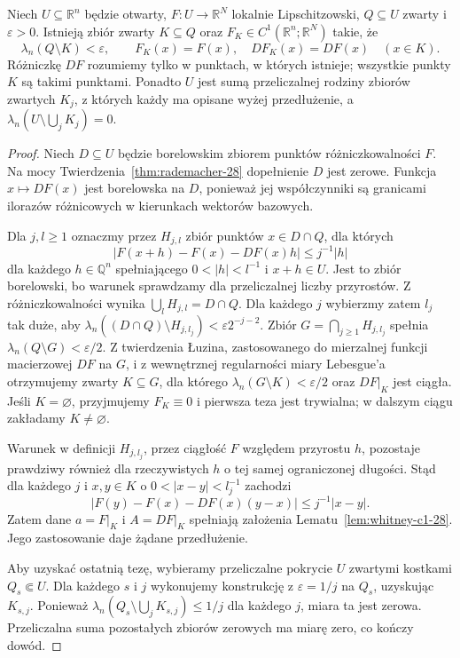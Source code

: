\begin{lemat}
\label{lem:lusin-whitney-28}
Niech $U\subseteq\mathbb R^n$ będzie otwarty,
$F:U\to\mathbb R^N$ lokalnie Lipschitzowski,
$Q\subseteq U$ zwarty i $\varepsilon>0$.
Istnieją zbiór zwarty $K\subseteq Q$ oraz
$F_K\in C^1(\mathbb R^n;\mathbb R^N)$ takie, że
\[
 \lambda_n(Q\setminus K)<\varepsilon,\qquad
 F_K(x)=F(x),\quad DF_K(x)=DF(x)\quad(x\in K).
\]
Różniczkę $DF$ rozumiemy tylko w punktach,
w których istnieje; wszystkie punkty $K$ są
takimi punktami. Ponadto $U$ jest sumą przeliczalnej
rodziny zbiorów zwartych $K_j$, z których każdy
ma opisane wyżej przedłużenie, a
$\lambda_n(U\setminus\bigcup_jK_j)=0$.
\end{lemat}
\begin{proof}
Niech $D\subseteq U$ będzie borelowskim zbiorem
punktów różniczkowalności $F$. Na mocy
Twierdzenia~\ref{thm:rademacher-28} dopełnienie
$D$ jest zerowe. Funkcja $x\mapsto DF(x)$ jest
borelowska na $D$, ponieważ jej współczynniki
są granicami ilorazów różnicowych w kierunkach
wektorów bazowych.

Dla $j,l\ge1$ oznaczmy przez $H_{j,l}$ zbiór
punktów $x\in D\cap Q$, dla których
\[
 |F(x+h)-F(x)-DF(x)h|\le j^{-1}|h|
\]
dla każdego $h\in\mathbb Q^n$ spełniającego
$0<|h|<l^{-1}$ i $x+h\in U$. Jest to zbiór
borelowski, bo warunek sprawdzamy dla
przeliczalnej liczby przyrostów. Z różniczkowalności
wynika $\bigcup_lH_{j,l}=D\cap Q$.
Dla każdego $j$ wybierzmy zatem $l_j$ tak duże,
aby $\lambda_n((D\cap Q)\setminus H_{j,l_j})
<\varepsilon2^{-j-2}$. Zbiór
$G=\bigcap_{j\ge1}H_{j,l_j}$ spełnia
$\lambda_n(Q\setminus G)<\varepsilon/2$.
Z twierdzenia Łuzina, zastosowanego do mierzalnej
funkcji macierzowej $DF$ na $G$, i z wewnętrznej
regularności miary Lebesgue'a otrzymujemy zwarty
$K\subseteq G$, dla którego
$\lambda_n(G\setminus K)<\varepsilon/2$ oraz
$DF|_K$ jest ciągła. Jeśli $K=\varnothing$,
przyjmujemy $F_K\equiv0$ i pierwsza teza jest
trywialna; w dalszym ciągu zakładamy $K\ne\varnothing$.

Warunek w definicji $H_{j,l_j}$, przez ciągłość
$F$ względem przyrostu $h$, pozostaje prawdziwy
również dla rzeczywistych $h$ o tej samej
ograniczonej długości. Stąd dla każdego $j$ i
$x,y\in K$ o $0<|x-y|<l_j^{-1}$ zachodzi
\[
 |F(y)-F(x)-DF(x)(y-x)|\le j^{-1}|x-y|.
\]
Zatem dane $a=F|_K$ i $A=DF|_K$ spełniają
założenia Lematu~\ref{lem:whitney-c1-28}.
Jego zastosowanie daje żądane przedłużenie.

Aby uzyskać ostatnią tezę, wybieramy przeliczalne
pokrycie $U$ zwartymi kostkami $Q_s\Subset U$.
Dla każdego $s$ i $j$ wykonujemy konstrukcję
z $\varepsilon=1/j$ na $Q_s$, uzyskując
$K_{s,j}$. Ponieważ
$\lambda_n(Q_s\setminus\bigcup_jK_{s,j})\le1/j$
dla każdego $j$, miara ta jest zerowa.
Przeliczalna suma pozostałych zbiorów zerowych
ma miarę zero, co kończy dowód.
\end{proof}


